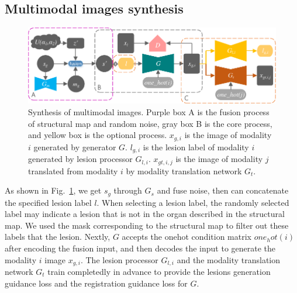 \documentclass[runningheads]{llncs}
\begin{document}
	\subsection{Multimodal images synthesis}
	\begin{figure}
		\centering
		\includegraphics[width=1\columnwidth]{figures/mm_mri_generate_train}
		\caption{Synthesis of multimodal images. Purple box A is the fusion process of structural map and random noise, gray box B is the core process, and yellow box is the optional process. 
			$x_{g,i}$ is the image of modality $i$ generated by generator $G$. 
			$l_{g,i}$ is the lesion label of modality $i$ generated by lesion processor $G_{l,i}$.
			$x_{gt,i,j}$ is the image of modality $j$ translated from modality $i$ by modality translation network $G_t$.
		}
		\label{mm_mri_generate}
	\end{figure}
	As shown in Fig.~\ref{mm_mri_generate}, we get $s_g$ through $G_s$ and fuse noise, then can concatenate the specified lesion label $l$. When selecting a lesion label, the randomly selected label may indicate a lesion that is not in the organ described in the structural map. We used the mask corresponding to the structural map to filter out these labels that the lesion. Nextly, $G$ accepts the onehot condition matrix $one_hot(i)$ after encoding the fusion input, and then decodes the input to generate the modality $i$ image $x_{g,i}$. The lesion processor $G_{l,i}$ and the modality translation network $G_t$ train completedly in advance to provide the lesions generation guidance loss and the registration guidance loss for $G$.
	
\end{document}
